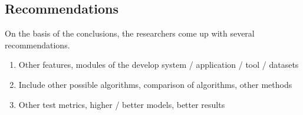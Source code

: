 \noindent
\subsection{ Recommendations}
\vspace{-2ex}On the basis of the conclusions, the researchers come up with several recommendations.  
\vspace{-3ex}
\begin{enumerate}
	\item Other features, modules of the develop system / application / tool / datasets
	\item Include other possible algorithms, comparison of algorithms, other methods
	\item Other test metrics, higher / better models, better results
\end{enumerate}
